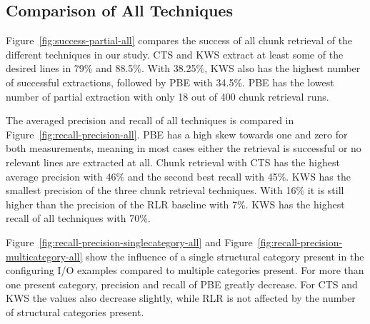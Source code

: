 \documentclass[\myrootdir/main.tex]{subfiles}
\begin{document}
\subsection{Comparison of All Techniques}
Figure~\ref{fig:success-partial-all} compares the success of all chunk retrieval of the different techniques in our study.
CTS and KWS extract at least some of the desired lines in 79\% and 88.5\%.
With 38.25\%, KWS also has the highest number of successful extractions, followed by PBE with 34.5\%.
PBE has the lowest number of partial extraction with only 18 out of 400 chunk retrieval runs.

The averaged precision and recall of all techniques is compared in Figure~\ref{fig:recall-precision-all}.
PBE has a high skew towards one and zero for both measurements, meaning in most cases either the retrieval is successful or no relevant lines are extracted at all.
Chunk retrieval with CTS has the highest average precision with 46\% and the second best recall with 45\%.
KWS has the smallest precision of the three chunk retrieval techniques.
With 16\% it is still higher than the precision of the RLR baseline with 7\%.
KWS has the highest recall of all techniques with 70\%.

Figure~\ref{fig:recall-precision-singlecategory-all} and Figure~\ref{fig:recall-precision-multicategory-all} show the influence of a single structural category present in the configuring I/O examples compared to multiple categories present.
For more than one present category, precision and recall of PBE greatly decrease.
For CTS and KWS the values also decrease slightly, while RLR is not affected by the number of structural categories present.
\end{document}
